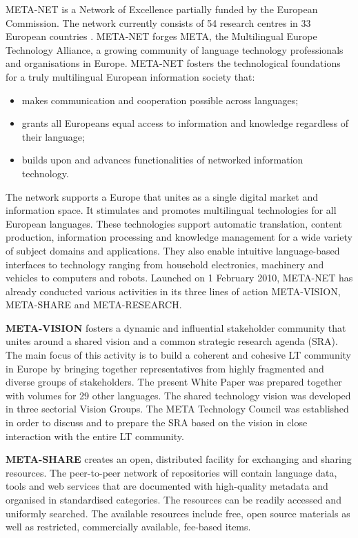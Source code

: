 \begin{multicols}{2}
META-NET is a Network of Excellence partially funded by the European Commission. The network currently consists of 54 research centres in 33 European countries \cite{rehm2011}. META-NET forges META, the Multilingual Europe Technology Alliance, a growing community of language technology professionals and organisations in Europe. META-NET fosters the technological foundations for a truly multilingual European information society that:

\begin{itemize}
\item makes communication and cooperation possible across languages;
\item grants all Europeans equal access to information and knowledge regardless of their language;
\item builds upon and advances functionalities of networked information technology.
\end{itemize}

The network supports a Europe that unites as a single digital market and information space. It stimulates and promotes multilingual technologies for all European languages. These technologies support automatic translation, content production, information processing and knowledge management for a wide variety of subject domains and applications. They also enable intuitive language-based interfaces to technology ranging from household electronics, machinery and vehicles to computers and robots.
Launched on 1 February 2010, META-NET has already conducted various activities in its three lines of action META-VISION, META-SHARE and META-RESEARCH.

\textbf{META-VISION} fosters a dynamic and influential stakeholder community that unites around a shared vision and a common strategic research agenda (SRA). The main focus of this activity is to build a coherent and cohesive LT community in Europe by bringing together representatives from highly fragmented and diverse groups of stakeholders. The present White Paper was prepared together with volumes for 29 other languages. The shared technology vision was developed in three sectorial Vision Groups. The META Technology Council was established in order to discuss and to prepare the SRA based on the vision in close interaction with the entire LT community.

\textbf{META-SHARE} creates an open, distributed facility for exchanging and sharing resources. The peer-to-peer network of repositories will contain language data, tools and web services that are documented with high-quality metadata and organised in standardised categories. The resources can be readily accessed and uniformly searched. The available resources include free, open source materials as well as restricted, commercially available, fee-based items.


\end{multicols}

